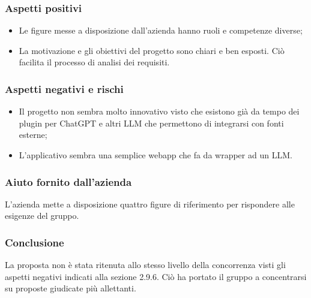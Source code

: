 \documentclass[10pt]{article}
\begin{document}
\subsubsection{Aspetti positivi}
\begin{itemize}
    \item Le figure messe a disposizione dall’azienda hanno ruoli e competenze diverse;
    \item La motivazione e gli obiettivi del progetto sono chiari e ben esposti. Ciò facilita il processo di analisi dei requisiti.
\end{itemize}
\subsubsection{Aspetti negativi e rischi}
\begin{itemize}
    \item Il progetto non sembra molto innovativo visto che esistono già da tempo dei plugin per ChatGPT e altri LLM che permettono di integrarsi con fonti esterne;
    \item L'applicativo sembra una semplice webapp che fa da wrapper ad un LLM.
\end{itemize}
\subsubsection{Aiuto fornito dall'azienda}
L’azienda mette a disposizione quattro figure di riferimento per rispondere alle esigenze del gruppo.
\subsubsection{Conclusione}
La proposta non è stata ritenuta allo stesso livello della concorrenza visti gli aspetti negativi indicati alla sezione 2.9.6. Ciò ha portato il gruppo a concentrarsi su proposte giudicate più allettanti.
\\\\
\end{document}
